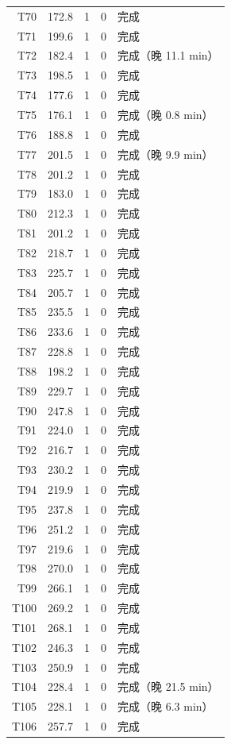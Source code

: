\documentclass[a4paper,11pt]{article}
\begin{document}
\begin{table}[htbp]
\begin{tabular}{rcccl}
T70 & 172.8 & 1 & 0 & 完成 \\
T71 & 199.6 & 1 & 0 & 完成 \\
T72 & 182.4 & 1 & 0 & 完成（晚 11.1 min） \\
T73 & 198.5 & 1 & 0 & 完成 \\
T74 & 177.6 & 1 & 0 & 完成 \\
T75 & 176.1 & 1 & 0 & 完成（晚 0.8 min） \\
T76 & 188.8 & 1 & 0 & 完成 \\
T77 & 201.5 & 1 & 0 & 完成（晚 9.9 min） \\
T78 & 201.2 & 1 & 0 & 完成 \\
T79 & 183.0 & 1 & 0 & 完成 \\
T80 & 212.3 & 1 & 0 & 完成 \\
T81 & 201.2 & 1 & 0 & 完成 \\
T82 & 218.7 & 1 & 0 & 完成 \\
T83 & 225.7 & 1 & 0 & 完成 \\
T84 & 205.7 & 1 & 0 & 完成 \\
T85 & 235.5 & 1 & 0 & 完成 \\
T86 & 233.6 & 1 & 0 & 完成 \\
T87 & 228.8 & 1 & 0 & 完成 \\
T88 & 198.2 & 1 & 0 & 完成 \\
T89 & 229.7 & 1 & 0 & 完成 \\
T90 & 247.8 & 1 & 0 & 完成 \\
T91 & 224.0 & 1 & 0 & 完成 \\
T92 & 216.7 & 1 & 0 & 完成 \\
T93 & 230.2 & 1 & 0 & 完成 \\
T94 & 219.9 & 1 & 0 & 完成 \\
T95 & 237.8 & 1 & 0 & 完成 \\
T96 & 251.2 & 1 & 0 & 完成 \\
T97 & 219.6 & 1 & 0 & 完成 \\
T98 & 270.0 & 1 & 0 & 完成 \\
T99 & 266.1 & 1 & 0 & 完成 \\
T100 & 269.2 & 1 & 0 & 完成 \\
T101 & 268.1 & 1 & 0 & 完成 \\
T102 & 246.3 & 1 & 0 & 完成 \\
T103 & 250.9 & 1 & 0 & 完成 \\
T104 & 228.4 & 1 & 0 & 完成（晚 21.5 min） \\
T105 & 228.1 & 1 & 0 & 完成（晚 6.3 min） \\
T106 & 257.7 & 1 & 0 & 完成 \\

\end{tabular}
\end{table}
\end{document}
